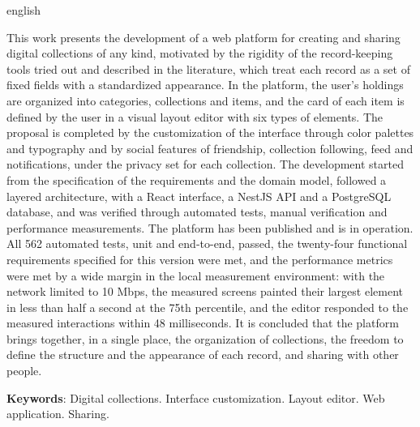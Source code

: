 \setlength{\absparsep}{18pt} %
\begin{resumo}[Abstract]

	\begin{otherlanguage*}{english}

		This work presents the development of a web platform for creating and sharing digital collections of any kind, motivated by the rigidity of the record-keeping tools tried out and described in the literature, which treat each record as a set of fixed fields with a standardized appearance. In the platform, the user's holdings are organized into categories, collections and items, and the card of each item is defined by the user in a visual layout editor with six types of elements. The proposal is completed by the customization of the interface through color palettes and typography and by social features of friendship, collection following, feed and notifications, under the privacy set for each collection. The development started from the specification of the requirements and the domain model, followed a layered architecture, with a React interface, a NestJS API and a PostgreSQL database, and was verified through automated tests, manual verification and performance measurements. The platform has been published and is in operation. All 562 automated tests, unit and end-to-end, passed, the twenty-four functional requirements specified for this version were met, and the performance metrics were met by a wide margin in the local measurement environment: with the network limited to 10 Mbps, the measured screens painted their largest element in less than half a second at the 75th percentile, and the editor responded to the measured interactions within 48 milliseconds. It is concluded that the platform brings together, in a single place, the organization of collections, the freedom to define the structure and the appearance of each record, and sharing with other people.

		\vspace{\onelineskip}

		\textbf{Keywords}: Digital collections. Interface customization. Layout editor. Web application. Sharing.

	\end{otherlanguage*}

\end{resumo}
